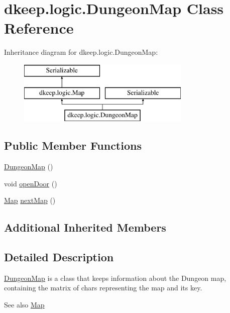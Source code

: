 \hypertarget{classdkeep_1_1logic_1_1_dungeon_map}{}\section{dkeep.\+logic.\+Dungeon\+Map Class Reference}
\label{classdkeep_1_1logic_1_1_dungeon_map}
Inheritance diagram for dkeep.\+logic.\+Dungeon\+Map\+:\begin{figure}[H]
\begin{center}
\leavevmode
\includegraphics[height=3.000000cm]{classdkeep_1_1logic_1_1_dungeon_map}
\end{center}
\end{figure}
\subsection*{Public Member Functions}
\begin{DoxyCompactItemize}
\item 
\hyperlink{classdkeep_1_1logic_1_1_dungeon_map_a9b2b6c3f5e78b0858776f215cb598a57}{Dungeon\+Map} ()
\item 
void \hyperlink{classdkeep_1_1logic_1_1_dungeon_map_a066ca2ea676b967ef7f7df8fa8ccc42f}{open\+Door} ()
\item 
\hyperlink{classdkeep_1_1logic_1_1_map}{Map} \hyperlink{classdkeep_1_1logic_1_1_dungeon_map_ae409aae5287e52c942d674ff8b6c838b}{next\+Map} ()
\end{DoxyCompactItemize}
\subsection*{Additional Inherited Members}


\subsection{Detailed Description}
\hyperlink{classdkeep_1_1logic_1_1_dungeon_map}{Dungeon\+Map} is a class that keeps information about the Dungeon map, containing the matrix of chars representing the map and it\textquotesingle{}s key. \begin{DoxySeeAlso}{See also}
\hyperlink{classdkeep_1_1logic_1_1_map}{Map} 
\end{DoxySeeAlso}


